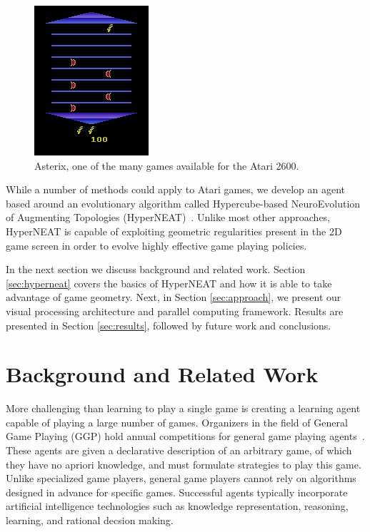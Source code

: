 \documentclass{acm_proc_article-sp}
\begin{document}
\begin{figure}[t]
\begin{center}
\includegraphics[width=.5\columnwidth]{figures/asterix.png}
\end{center}
\caption{Asterix, one of the many games available for the Atari 2600.}
\label{fig:asterix}
\end{figure}

While a number of methods could apply to Atari games, we develop an agent based around an evolutionary algorithm called Hypercube-based NeuroEvolution of Augmenting Topologies (HyperNEAT)~\cite{gauci08}. Unlike most other approaches, HyperNEAT is capable of exploiting geometric regularities present in the 2D game screen in order to evolve highly effective game playing policies. 

In the next section we discuss background and related work. Section \ref{sec:hyperneat} covers the basics of HyperNEAT and how it is able to take advantage of game geometry. Next, in Section \ref{sec:approach}, we present our visual processing architecture and parallel computing framework. Results are presented in Section \ref{sec:results}, followed by future work and conclusions.

\section{Background and Related Work}
\label{sec:background}
More challenging than learning to play a single game is creating a learning agent capable of playing a large number of games. Organizers in the field of General Game Playing (GGP) hold annual competitions for general game playing agents~\cite{genesereth05}. These agents are given a declarative description of an arbitrary game, of which they have no apriori knowledge, and must formulate strategies to play this game. Unlike specialized game players, general game players cannot rely on algorithms designed in advance for specific games. Successful agents typically incorporate artificial intelligence technologies such as knowledge representation, reasoning, learning, and rational decsion making. 
\end{document}

